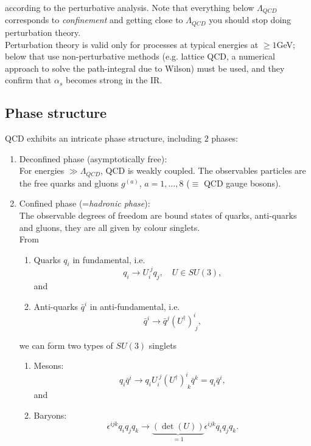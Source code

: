 according to the perturbative analysis. Note that everything below $\Lambda_{QCD}$ corresponds to \emph{confinement} and getting close to $\Lambda_{QCD}$ you should stop doing perturbation theory.
\\
Perturbation theory is valid only for processes at typical energies at $\geq 1$GeV; below that use non-perturbative methods (e.g. lattice QCD, a numerical approach to solve the path-integral due to Wilson) must be used, and they confirm that $\alpha_s$ becomes strong in the IR.
\subsection{Phase structure}
QCD exhibits an intricate phase structure, including $2$ phases:
\begin{enumerate}
\item Deconfined phase (asymptotically free):\\
For energies $\gg \Lambda_{QCD}$, QCD is weakly coupled. The observables particles are the free quarks and gluons $g^{(a)}$, $a=1,\dots,8$ ($\equiv$ QCD gauge bosons).
\item Confined phase (=\emph{hadronic phase}):\\
The observable degrees of freedom are bound states of quarks, anti-quarks and gluons, they are all given by colour singlets.\\
From
\begin{enumerate}
	\item Quarks $q_i$ in fundamental, i.e.
	\begin{equation}
		q_i \rightarrow U^{\;j}_i q_j,\quad U\in SU(3),
	\end{equation}
	and
	\item Anti-quarks $\bar{q}^i$ in anti-fundamental, i.e.
	\begin{equation}
		\bar{q}^i \rightarrow \bar{q}^j (U^\dagger)^i_{\;j},
	\end{equation}
\end{enumerate}
we can form two types of $SU(3)$ singlets
\begin{enumerate}
	\item Mesons:
	\begin{equation}
		q_i \bar{ q}^i \rightarrow q_i U^{\;j}_i (U^\dagger)^i_{\;k} \bar{q}^k = q_i \bar{q}^i,
	\end{equation}
	and
	\item Baryons:
	\begin{equation}
		\epsilon^{ijk} q_i q_j q_k \rightarrow \underbrace{(\det(U))}_{=1} \epsilon^{ijk} q_i q_j q_k.
	\end{equation}
\end{enumerate}
\end{enumerate}
